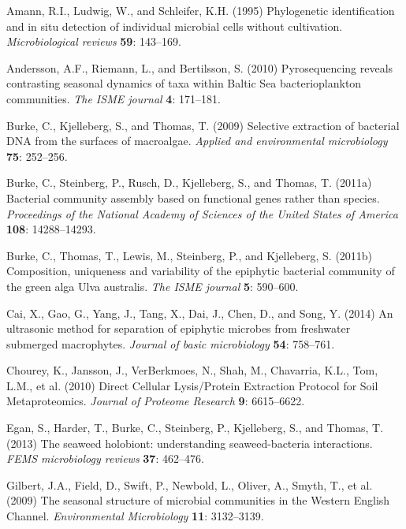 \documentclass[12pt,]{article}
\begin{document}
\hypertarget{refs}{}
\hypertarget{ref-Amann1995}{}
Amann, R.I., Ludwig, W., and Schleifer, K.H. (1995) Phylogenetic
identification and in situ detection of individual microbial cells
without cultivation. \emph{Microbiological reviews} \textbf{59}:
143--169.

\hypertarget{ref-Andersson2010}{}
Andersson, A.F., Riemann, L., and Bertilsson, S. (2010) Pyrosequencing
reveals contrasting seasonal dynamics of taxa within Baltic Sea
bacterioplankton communities. \emph{The ISME journal} \textbf{4}:
171--181.

\hypertarget{ref-Burke2009}{}
Burke, C., Kjelleberg, S., and Thomas, T. (2009) Selective extraction of
bacterial DNA from the surfaces of macroalgae. \emph{Applied and
environmental microbiology} \textbf{75}: 252--256.

\hypertarget{ref-Burke2011a}{}
Burke, C., Steinberg, P., Rusch, D., Kjelleberg, S., and Thomas, T.
(2011a) Bacterial community assembly based on functional genes rather
than species. \emph{Proceedings of the National Academy of Sciences of
the United States of America} \textbf{108}: 14288--14293.

\hypertarget{ref-Burke2011b}{}
Burke, C., Thomas, T., Lewis, M., Steinberg, P., and Kjelleberg, S.
(2011b) Composition, uniqueness and variability of the epiphytic
bacterial community of the green alga Ulva australis. \emph{The ISME
journal} \textbf{5}: 590--600.

\hypertarget{ref-Cai2014}{}
Cai, X., Gao, G., Yang, J., Tang, X., Dai, J., Chen, D., and Song, Y.
(2014) An ultrasonic method for separation of epiphytic microbes from
freshwater submerged macrophytes. \emph{Journal of basic microbiology}
\textbf{54}: 758--761.

\hypertarget{ref-Chourey2010}{}
Chourey, K., Jansson, J., VerBerkmoes, N., Shah, M., Chavarria, K.L.,
Tom, L.M., et al. (2010) Direct Cellular Lysis/Protein Extraction
Protocol for Soil Metaproteomics. \emph{Journal of Proteome Research}
\textbf{9}: 6615--6622.

\hypertarget{ref-Egan2013}{}
Egan, S., Harder, T., Burke, C., Steinberg, P., Kjelleberg, S., and
Thomas, T. (2013) The seaweed holobiont: understanding seaweed-bacteria
interactions. \emph{FEMS microbiology reviews} \textbf{37}: 462--476.

\hypertarget{ref-Gilbert2009}{}
Gilbert, J.A., Field, D., Swift, P., Newbold, L., Oliver, A., Smyth, T.,
et al. (2009) The seasonal structure of microbial communities in the
Western English Channel. \emph{Environmental Microbiology} \textbf{11}:
3132--3139.
\end{document}
